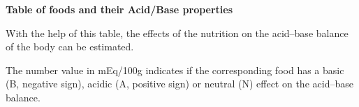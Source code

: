 \documentclass[../main.tex]{subfiles}
\begin{document}
\textbf{Table of foods and their Acid/Base properties}

With the help of this table, the effects of the nutrition on the acid--base balance of the body can be estimated.

The number value in mEq/100g indicates if the corresponding food has a basic (B, negative sign),
acidic (A, positive sign) or neutral (N) effect on the acid--base balance.
\end{document}
